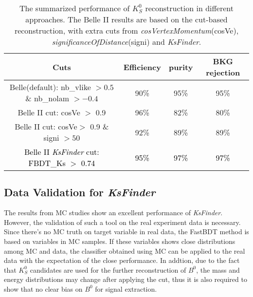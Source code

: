 \begin{table}
	\small
	\caption{The summarized performance of $K_S^0$ reconstruction in different approaches. The Belle II results are based on the cut-based reconstruction, with extra cuts from \textit{cosVertexMomentum}(cosVe), \textit{significanceOfDistance}(signi) and \textit{KsFinder}. }
	\label{tab:ksperf}
	\begin{tabular}{c|c|c|c} 
		\hline
		Cuts &  Efficiency & purity & BKG rejection\\
		\hline
		Belle(default): nb\_vlike $>0.5$ \& nb\_nolam $> -0.4$ & 90\% & 95\% & 95\% \\
		Belle II cut: cosVe $>$ 0.9 & 96\% & 82\% & 80\% \\
		Belle II cut: cosVe$>$ 0.9 \& signi $>50$ & 92\% & 89\% & 89\% \\
		\textcolor{black}{Belle II \textit{KsFinder} cut: FBDT\_Ks $>$ 0.74} & \textcolor{black}{95\%} & \textcolor{black}{97\%}  & \textcolor{black}{97\%} \\
		\hline
	\end{tabular}
\end{table}

\subsection{Data Validation for \textit{KsFinder}}
The results from MC studies show an excellent performance of \textit{KsFinder}. However, the validation of such a tool on the real experiment data is necessary. Since there's no MC truth on target variable in real data, the FastBDT method is based on variables in MC samples. If these variables shows close distributions among MC and data, the classifier obtained using MC can be applied to the real data with the expectation of the close performance.
In addtion, due to the fact that $K_S^0$ candidates are used for the further reconstruction of $B^0$, the  mass and energy distributions may change after applying the cut, thus it is also required to show that no clear bias on $B^0$ for signal extraction.


